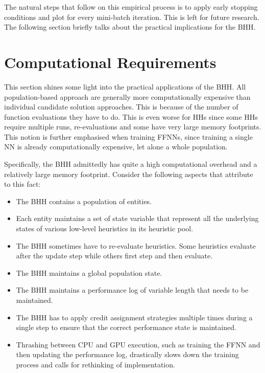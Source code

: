 The natural steps that follow on this empirical process is to apply early stopping conditions and plot for every mini-batch iteration. This is left for future research. The following section briefly talks about the practical implications for the \Ac{BHH}.


\section{Computational Requirements}
\label{sec:results:computational_requirements}

This section shines some light into the practical applications of the \Ac{BHH}. All population-based approach are generally more computationally expensive than individual candidate solution approaches. This is because of the number of function evaluations they have to do. This is even worse for \acp{HH} since some \acp{HH} require multiple runs, re-evaluations and some have very large memory footprints. This notion is further emphasised when training \acp{FFNN}, since training a single \ac{NN} is already computationally expensive, let alone a whole population.

Specifically, the \Ac{BHH} admittedly has quite a high computational overhead and a relatively large memory footprint. Consider the following aspects that attribute to this fact:

\begin{itemize}
    \item The \Ac{BHH} contains a population of entities.
    \item Each entity maintains a set of state variable that represent all the underlying states of various low-level heuristics in its heuristic pool.
    \item The \Ac{BHH} sometimes have to re-evaluate heuristics. Some heuristics evaluate after the update step while others first step and then evaluate.
    \item The \Ac{BHH} maintains a global population state.
    \item The \Ac{BHH} maintains a performance log of variable length that needs to be maintained.
    \item The \Ac{BHH} has to apply credit assignment strategies multiple times during a single step to ensure that the correct performance state is maintained.
    \item Thrashing between CPU and GPU execution, such as training the \Acs{FFNN} and then updating the performance log, drastically slows down the training process and calls for rethinking of  implementation. 
\end{itemize}

